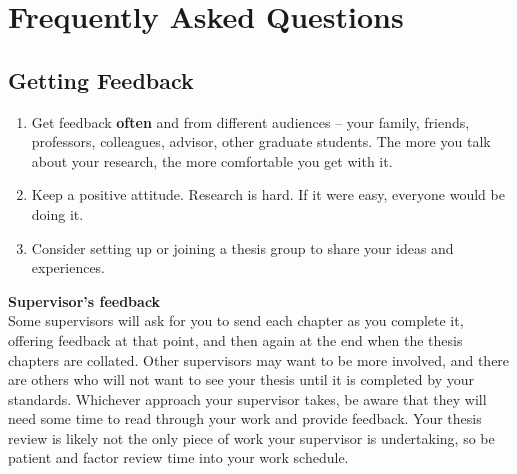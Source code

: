 \appendix

\chapter{Frequently Asked Questions} %

\label{Appendix} %

\section{Getting Feedback}
\label{app:feedback}

\begin{enumerate}
	\item Get feedback \textbf{often} and from different audiences – your family,
	      friends, professors, colleagues, advisor, other graduate students. The more you
	      talk about your research, the more comfortable you get with it.
	\item Keep a positive attitude. Research is hard. If it were easy, everyone would be
	      doing it.
	\item Consider setting up or joining a thesis group to share your ideas and
	      experiences.
\end{enumerate}

\textbf{Supervisor's feedback}\\
Some supervisors will ask for you to send each chapter as you complete it, offering feedback at that point, and then again at the end when the thesis chapters are collated. Other supervisors may want to be more involved, and there are others who will not want to see your thesis until it is completed by your standards. Whichever approach your supervisor takes, be aware that they will need some time to read through your work and provide feedback. Your thesis review is likely not the only piece of work your supervisor is undertaking, so be patient and factor review time into your work schedule.

